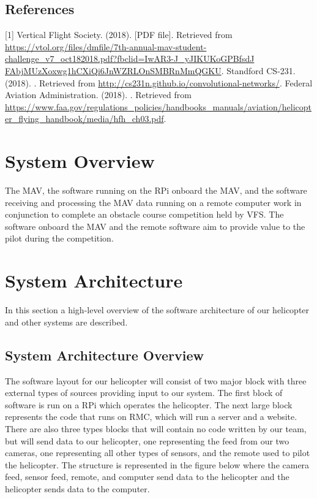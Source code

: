 \documentclass[onecolumn, oneside, letterpaper, draftclsnofoot, 10pt, compsoc]{IEEEtran}
\begin{document}
\subsection{References}
[1]
\newblock Vertical Flight Society. (2018).
 [PDF file].
\newblock Retrieved from \url{https://vtol.org/files/dmfile/7th-annual-mav-student-challenge_v7_oct182018.pdf?fbclid=IwAR3-J_yJIKUKoGPBfsdJ}\\ \url{FAbjMUzXoxwg1hCXiQi6JnWZRLOnSMBRnMmQGKU}.
\noindent \newline
[2]
\newblock Standford CS-231. (2018).
.
\newblock Retrieved from \url{http://cs231n.github.io/convolutional-networks/}.
\noindent \newline
[3]
\newblock Federal Aviation Administration. (2018).
.
\newblock Retrieved from \url{https://www.faa.gov/regulations_policies/handbooks_manuals/aviation/helicopter_flying_handbook/media/hfh_ch03.pdf}.

\section{System Overview}
The MAV, the software running on the RPi onboard the MAV, and the software receiving and processing the MAV data running on a remote computer work in conjunction to complete an obstacle course competition held by VFS. The software onboard the MAV and the remote software aim to provide value to the pilot during the competition.

\section{System Architecture}

In this section a high-level overview of the software architecture of our helicopter and other systems are described.
\subsection{System Architecture Overview}

The software layout for our helicopter will consist of two major block with three external types of sources providing input to our system. The first block of software is run on a RPi which operates the helicopter. The next large block represents the code that runs on RMC, which will run a server and a website. There are also three types blocks that will contain no code written by our team, but will send data to our helicopter, one representing the feed from our two cameras, one representing all other types of sensors, and the remote used to pilot the helicopter. The structure is represented in the figure below where the camera feed, sensor feed, remote, and computer send data to the helicopter and the helicopter sends data to the computer.
\end{document}
